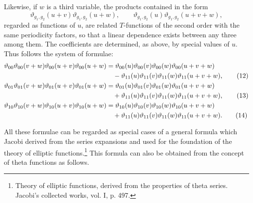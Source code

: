 \documentclass[11pt]{article}
\providecommand{\tht}{\vartheta}
\begin{document}
Likewise, if $w$ is a third variable, the products contained in the form
\[
\tht_{g_1,g_2}(u+v)\tht_{g_1,g_2}(u+w),\qquad
\tht_{g_1,g_2}(u)\tht_{g_1,g_2}(u+v+w),
\]
regarded as functions of $u$, are related $T$-functions of the second order with the same periodicity factors, so that a linear dependence exists between any three among them. The coefficients are determined, as above, by special values of $u$. Thus follows the system of formulae:
\begin{align}
\tht_{00}\tht_{00}(v+w)\tht_{00}(u+v)\tht_{00}(u+w)
&=\tht_{00}(u)\tht_{00}(v)\tht_{00}(w)\tht_{00}(u+v+w) \notag\\
&\quad -\tht_{11}(u)\tht_{11}(v)\tht_{11}(w)\tht_{11}(u+v+w), \tag{12}\\
\tht_{01}\tht_{01}(v+w)\tht_{01}(u+v)\tht_{01}(u+w)
&=\tht_{01}(u)\tht_{01}(v)\tht_{01}(w)\tht_{01}(u+v+w) \notag\\
&\quad +\tht_{11}(u)\tht_{11}(v)\tht_{11}(w)\tht_{11}(u+v+w), \tag{13}\\
\tht_{10}\tht_{10}(v+w)\tht_{10}(u+v)\tht_{10}(u+w)
&=\tht_{10}(u)\tht_{10}(v)\tht_{10}(w)\tht_{10}(u+v+w) \notag\\
&\quad +\tht_{11}(u)\tht_{11}(v)\tht_{11}(w)\tht_{11}(u+v+w). \tag{14}
\end{align}

All these formulae can be regarded as special cases of a general formula which Jacobi derived from the series expansions and used for the foundation of the theory of elliptic functions.\footnote{Theory of elliptic functions, derived from the properties of theta series. Jacobi's collected works, vol. I, p. 497.} This formula can also be obtained from the concept of theta functions as follows.
\end{document}
